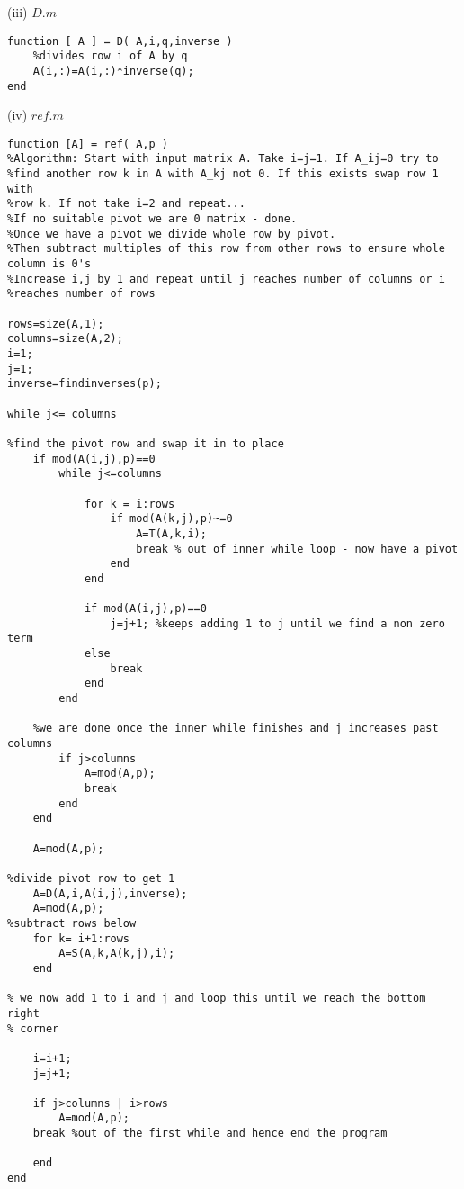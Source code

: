 \documentclass[10pt,a4paper]{report}
\begin{document}
(iii) $D.m$
\begin{verbatim}
function [ A ] = D( A,i,q,inverse )
    %divides row i of A by q
    A(i,:)=A(i,:)*inverse(q);
end
\end{verbatim}
\vspace{0.5cm}


\newpage

(iv) $ref.m$
\begin{verbatim}
function [A] = ref( A,p )
%Algorithm: Start with input matrix A. Take i=j=1. If A_ij=0 try to
%find another row k in A with A_kj not 0. If this exists swap row 1 with
%row k. If not take i=2 and repeat... 
%If no suitable pivot we are 0 matrix - done.
%Once we have a pivot we divide whole row by pivot.
%Then subtract multiples of this row from other rows to ensure whole column is 0's 
%Increase i,j by 1 and repeat until j reaches number of columns or i
%reaches number of rows

rows=size(A,1);
columns=size(A,2);
i=1;
j=1;
inverse=findinverses(p);

while j<= columns

%find the pivot row and swap it in to place
    if mod(A(i,j),p)==0
        while j<=columns
    
            for k = i:rows
                if mod(A(k,j),p)~=0
                    A=T(A,k,i);
                    break % out of inner while loop - now have a pivot
                end
            end
        
            if mod(A(i,j),p)==0
                j=j+1; %keeps adding 1 to j until we find a non zero term
            else
                break
            end
        end
    
    %we are done once the inner while finishes and j increases past columns
        if j>columns 
            A=mod(A,p);
            break
        end
    end

    A=mod(A,p);

%divide pivot row to get 1
    A=D(A,i,A(i,j),inverse);
    A=mod(A,p);
%subtract rows below
    for k= i+1:rows
        A=S(A,k,A(k,j),i);  
    end

% we now add 1 to i and j and loop this until we reach the bottom right
% corner

    i=i+1;
    j=j+1;

    if j>columns | i>rows
        A=mod(A,p);
    break %out of the first while and hence end the program
    
    end
end
\end{verbatim}
\vspace{1cm}
\end{document}
